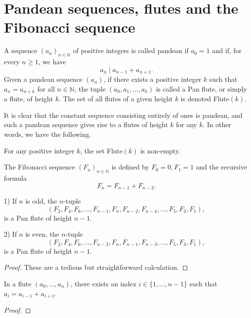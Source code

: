 
\chapter{Pandean sequences, flutes and the Fibonacci sequence}
\begin{definition}
    \label{def:pandean}
    A sequence $(a_n)_{n \in \mathbb{N}}$ of positive integers is called pandean if $a_0 = 1$ and 
    if, for every $n \geq 1$, we have
    \[
        a_n \mid a_{n-1} + a_{n+1}.
    \]
    Given a pandean sequence $(a_n)$, if there exists a positive integer $k$ such that $a_n = a_{n+k}$ for all $n\in \mathbb{N}$, 
    the tuple $(a_0, a_1, \ldots, a_k)$ is called a Pan flute, or simply a flute, of height $k$. The set of all flutes of a given height $k$ 
    is denoted Flute$(k)$.
\end{definition}
It is clear that the constant sequence consisting entirely of ones is pandean, and such a pandean sequence gives rise to a flutes of height $k$ for any $k$.
In other words, we have the following.
\begin{lemma}
    \label{l:kFluteNonEmpty}
    For any positive integer $k$, the set Flute$(k)$ is non-empty.
\end{lemma}

\begin{definition}
    \label{def:fib}
    The Fibonacci sequence $(F_n)_{n \in \mathbb{N}}$ is defined by $F_0 = 0, F_1 = 1$ and the recursive formula
    \[
        F_n = F_{n-1} + F_{n-2}.
    \]
\end{definition}

\begin{lemma}
    \label{l:FibFlute}
    1) If $n$ is odd, the $n$-tuple 
    \[
        (F_2,F_4, F_6, \ldots, F_{n-1}, F_{n}, F_{n-2}, F_{n-4}, \ldots, F_5, F_3, F_1), 
    \]
    is a Pan flute of height $n-1$.

    2) If $n$ is even, the $n$-tuple 
    \[
        (F_2, F_4, F_6, \ldots, F_{n-2}, F_{n}, F_{n-1}, F_{n-3}, \ldots, F_5, F_3,F_1),
    \]
    is a Pan flute of height $n-1$. 
\end{lemma}
\begin{proof}
    These are a tedious but straightforward calculation.
\end{proof}

\begin{lemma}
    \label{lem:FluteReduction}
    In a flute $(a_0, \ldots, a_n)$, there exists an index $i \in \{1,\ldots, n-1\}$ 
    such that $a_i = a_{i-1} + a_{i+1}$.
\end{lemma}
\begin{proof}

\end{proof}

